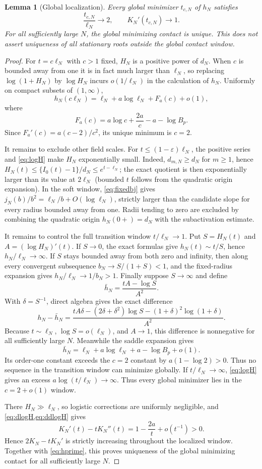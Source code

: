 \documentclass[11pt]{article}
\newtheorem{lemma}[theorem]{Lemma}
\begin{document}
\begin{lemma}[Global localization]
\label{lem:localize}
Every global minimizer $t_{c,N}$ of $h_N$ satisfies
\[
 \frac{t_{c,N}}{\ell_N}\longrightarrow2,
 \qquad K_N'(t_{c,N})\longrightarrow1.                 \label{eq:localize}
\]
For all sufficiently large $N$, the global minimizing contact is unique.
This does not assert uniqueness of all stationary roots outside the global
contact window.
\end{lemma}

\begin{proof}
For $t=c\ell_N$ with $c>1$ fixed, $H_N$ is a positive power of $d_N$.
When $c$ is bounded away from one it is in fact much larger than $\ell_N$,
so replacing $\log(1+H_N)$ by $\log H_N$ incurs $o(1/\ell_N)$ in the
calculation of $h_N$.  Uniformly on compact subsets of $(1,\infty)$,
\[
 h_N(c\ell_N)=\ell_N+a\log\ell_N+F_a(c)+o(1),           \label{eq:hF}
\]
where
\[
 F_a(c)=a\log c+\frac{2a}{c}-a-\log B_p.
\]
Since $F_a'(c)=a(c-2)/c^2$, its unique minimum is $c=2$.

It remains to exclude other field scales.  For
$t\le(1-\varepsilon)\ell_N$, the positive series and
\cref{eq:logH} make $H_N$ exponentially small.  Indeed,
$d_{m,N}\ge d_N$ for $m\ge1$, hence
$H_N(t)\le\{I_0(t)-1\}/d_N\le e^{t-\ell_N}$; the exact quotient is then
exponentially larger than its value at $2\ell_N$ (bounded $t$ follows from
the quadratic origin expansion).  In the soft window,
\cref{eq:fixedbj} gives $j_N(b)/b^2=\ell_N/b+O(\log\ell_N)$, strictly larger
than the candidate slope for every radius bounded away from one.  Radii
tending to zero are excluded by combining the quadratic origin
$h_N(0+)=d_N$ with the subactivation estimate.

It remains to control the full transition window $t/\ell_N\to1$.  Put
$S=H_N(t)$ and $A=(\log H_N)'(t)$.  If $S\to0$, the exact formulas give
$h_N(t)\sim t/S$, hence $h_N/\ell_N\to\infty$.  If $S$ stays bounded away
from both zero and infinity, then along every convergent subsequence
$b_N\to S/(1+S)<1$, and the fixed-radius expansion gives
$h_N/\ell_N\to1/b_N>1$.  Finally suppose $S\to\infty$ and define
\[
 \bar h_N=\frac{tA-\log S}{A^2}.
\]
With $\delta=S^{-1}$, direct algebra gives the exact difference
\[
 h_N-\bar h_N=
 \frac{tA\delta-(2\delta+\delta^2)\log S
 -(1+\delta)^2\log(1+\delta)}{A^2}.                    \tag{5.5}
\]
Because $t\sim\ell_N$, $\log S=o(\ell_N)$, and $A\to1$, this difference is
nonnegative for all sufficiently large $N$.  Meanwhile the saddle expansion
gives
\[
 \bar h_N=\ell_N+a\log\ell_N+a-\log B_p+o(1).
\]
Its order-one constant exceeds the $c=2$ constant by
$a(1-\log2)>0$.  Thus no sequence in the transition window can minimize
globally.  If
$t/\ell_N\to\infty$, \cref{eq:logH} gives an excess
$a\log(t/\ell_N)\to\infty$.  Thus every global minimizer lies in the
$c=2+o(1)$ window.

There $H_N\gg\ell_N$, so logistic corrections are uniformly negligible,
and \cref{eq:dlogH,eq:ddlogH} gives
\[
 K_N'(t)-tK_N''(t)=1-\frac{2a}{t}+o(t^{-1})>0.
\]
Hence $2K_N-tK_N'$ is strictly increasing throughout the localized window.
Together with \cref{eq:hprime}, this proves uniqueness of the global
minimizing contact for all sufficiently large $N$.
\end{proof}
\end{document}
